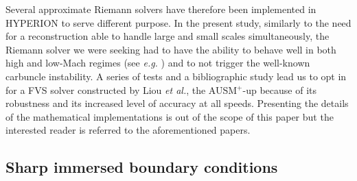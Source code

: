 Several approximate Riemann solvers have therefore been implemented in HYPERION to serve different purpose.
In the present study, similarly to the need for a reconstruction able to handle large and small scales simultaneously, the Riemann solver we were seeking had to have the ability to behave well in both high and low-Mach regimes (see \emph{e.g.} \cite{maier2021su2}) and to not trigger the well-known carbuncle instability\cite{kitamura2012carbuncle}.
A series of tests and a bibliographic study lead us to opt in for a FVS solver constructed by Liou \emph{et al.}, the AUSM$^+$-up \cite{liou1996sequel,liou2006sequel} because of its robustness and its increased level of accuracy at all speeds.
Presenting the details of the mathematical implementations is out of the scope of this paper but the interested reader is referred to the aforementioned papers.

\subsection{Sharp immersed boundary conditions}\label{ssec:ibc}

